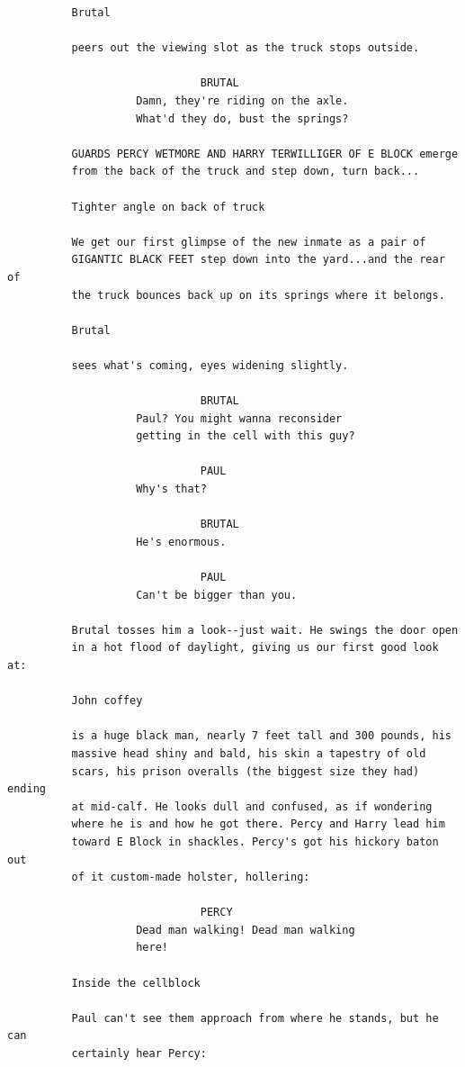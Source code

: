 \begin{verbatim}
          Brutal

          peers out the viewing slot as the truck stops outside.

                              BRUTAL
                    Damn, they're riding on the axle.
                    What'd they do, bust the springs?

          GUARDS PERCY WETMORE AND HARRY TERWILLIGER OF E BLOCK emerge
          from the back of the truck and step down, turn back...

          Tighter angle on back of truck

          We get our first glimpse of the new inmate as a pair of
          GIGANTIC BLACK FEET step down into the yard...and the rear of
          the truck bounces back up on its springs where it belongs.

          Brutal

          sees what's coming, eyes widening slightly.

                              BRUTAL
                    Paul? You might wanna reconsider
                    getting in the cell with this guy?

                              PAUL
                    Why's that?

                              BRUTAL
                    He's enormous.

                              PAUL
                    Can't be bigger than you.

          Brutal tosses him a look--just wait. He swings the door open
          in a hot flood of daylight, giving us our first good look at:

          John coffey

          is a huge black man, nearly 7 feet tall and 300 pounds, his
          massive head shiny and bald, his skin a tapestry of old
          scars, his prison overalls (the biggest size they had) ending
          at mid-calf. He looks dull and confused, as if wondering
          where he is and how he got there. Percy and Harry lead him
          toward E Block in shackles. Percy's got his hickory baton out
          of it custom-made holster, hollering:

                              PERCY
                    Dead man walking! Dead man walking
                    here!

          Inside the cellblock

          Paul can't see them approach from where he stands, but he can
          certainly hear Percy:


\end{verbatim}
